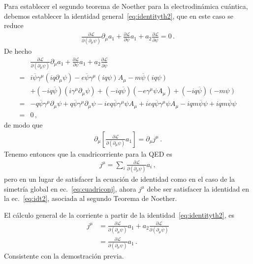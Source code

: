 \begin{frame}
Para establecer el segundo teorema de Noether para la electrodinámica cuántica, debemos establecer la identidad  general~\eqref{eq:identityth2}, que en este caso se reduce
\begin{align}
\frac{\partial\mathcal{L}}{\partial\left(\partial_{\mu} \psi\right)}
\partial_{\mu}a_{1}
+\frac{\partial \mathcal{L}}{\partial\psi}a_1
+a_2\frac{\partial \mathcal{L}}{\partial \overline{\psi}} =0\,.
\end{align}
De hecho
\begin{align}
&\frac{\partial\mathcal{L}}{\partial\left(\partial_{\mu} \psi\right)}
\partial_{\mu}a_{1}
+\frac{\partial \mathcal{L}}{\partial\psi}a_1
  +a_2\frac{\partial \mathcal{L}}{\partial \overline{\psi}}  \nonumber\\
=&i\overline{\psi}\gamma^{\mu}(iq\partial_{\mu} \psi)
-e\overline{\psi}\gamma^{\mu}(iq \psi)A_{\mu}
-m\overline{\psi}(iq \psi) \nonumber\\
&+\left( -iq\overline{\psi} \right)   \left( i \gamma^{\mu}\partial_{\mu}\psi \right)                                                      
+\left( -iq\overline{\psi} \right)\left( -e \gamma^{\mu}\psi A_{\mu} \right)
+\left( -iq\overline{\psi} \right)\left( -m\psi \right) \nonumber\\
    =&-q\overline{\psi}\gamma^{\mu}\partial_{\mu} \psi+ q\overline{\psi} \gamma^{\mu}\partial_{\mu}\psi
       -ieq\overline{\psi}\gamma^{\mu} \psi A_{\mu}+ieq \overline{\psi}  \gamma^{\mu}\psi A_{\mu}
       -iq m\overline{\psi}\psi +iqm\overline{\psi} \psi  \nonumber\\
=&0\,,
\end{align}
de modo que
\begin{align}
  \label{eq:idt2}
\partial_{\mu}\left[
\frac{\partial\mathcal{L}}{\partial\left(\partial_{\mu} \psi\right)}
a_{1}
\right]
  =\partial_{\mu}j^{\mu}\,.
\end{align}
Tenemo entonces que   la cuadricorriente para la QED es 
\begin{align}
  j^{\mu}=\sum_i\frac{\partial \mathcal{L}}{\partial\left(\partial_{\mu} \psi \right)}a_i\,,
\end{align}
pero en un lugar de satisfacer la ecuación de identidad como en el caso de la simetría global en ec.~\eqref{eq:cuadriconj}, ahora  $j^{\mu}$ debe ser satisfacer la identidad en la ec.~\eqref{eq:idt2}, asociada al segundo Teorema de Noether.

El cálculo general de la corriente a partir de la identidad~\eqref{eq:identityth2}, es
\begin{align}
  j^\mu&=\frac{\partial\mathcal{L}}{\partial\left(\partial_\mu\psi\right)}a_1+a_2\frac{\partial\mathcal{L}}{\partial\left(\partial_\mu\bar{\psi}\right)} \nonumber\\
  &=\frac{\partial\mathcal{L}}{\partial\left(\partial_\mu\psi\right)}a_1\,.
\end{align}
Consistente con la demostración previa.


\end{frame}
